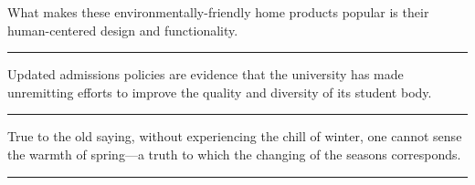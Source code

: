 \documentclass[11pt,a4paper]{article}
\newcommand{\num}[1]{\makebox[1.9em][r]{#1.}\hspace{0.3em}}
\newcommand{\wline}{\noindent\rule{\linewidth}{0.4pt}}
\begin{document}
\begin{minipage}{\linewidth}

\num{14}What makes these environmentally-friendly home products popular is their human-centered design and functionality.

\vspace{0.25em}

\wline

\end{minipage}

\begin{minipage}{\linewidth}

\num{15}Updated admissions policies are evidence that the university has made unremitting efforts to improve the quality and diversity of its student body.

\vspace{0.25em}

\wline

\end{minipage}

\begin{minipage}{\linewidth}

\num{16}True to the old saying, without experiencing the chill of winter, one cannot sense the warmth of spring—a truth to which the changing of the seasons corresponds.

\vspace{0.25em}

\wline

\end{minipage}
\end{document}
